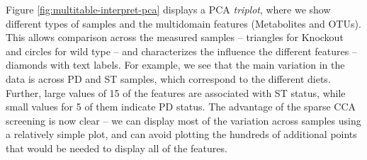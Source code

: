 \begin{knitrout}
\color{fgcolor}\begin{kframe}
\begin{alltt}
 \hlkwb{<-} \hlstd{(}\hlstd{(X[cca_res}\hlopt{$} \hlopt{!=} \hlstd{, ]),}
                  \hlstd{(metab[cca_res}\hlopt{$} \hlopt{!=} \hlstd{, ]))}
 \hlkwb{<-}     \hlstd{=} \hlstd{)}

 \hlkwb{<-} \hlstd{(}\hlopt{$} \hlstd{,} \hlstd{)}
 \hlkwb{<-} \hlstd{(}\hlopt{$} \hlstd{,} \hlstd{)}
 \hlkwb{<-} \hlstd{(}\hlstd{,} 
 \hlkwb{<-}  \hlstd{,} \hlstd{)}

 \hlkwb{<-} \hlopt{$}
 \hlkwb{<-} \hlopt{$}
                            \hlstd{=} \hlstd{(} \hlstd{,} \hlstd{))}
\end{alltt}
\end{kframe}
\end{knitrout}

Figure \ref{fig:multitable-interpret-pca} displays a PCA {\em triplot}, where we show
different types of samples and the multidomain features (Metabolites and OTUs).
This allows comparison across the measured samples -- triangles for
Knockout and circles for wild type --
and characterizes the influence the different features  -- diamonds with
text labels. For example, we see that the main variation in the data
is across PD and ST samples, which correspond to the different diets.
Further, large values of 15 of the features are associated with ST
status, while small values for 5 of them indicate PD status. The
advantage of the sparse CCA screening is now clear -- we  can display
most of the variation across samples using a relatively simple plot,
and can avoid plotting the hundreds of additional points that would be
needed to display all of the features.

